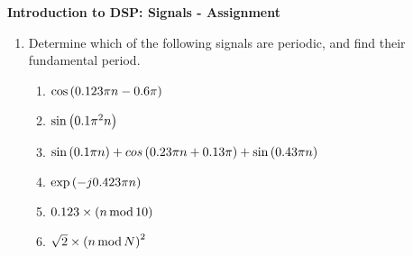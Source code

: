 \documentclass[9pt]{article}
\def\lp{\ensuremath\left(}
\def\rp{\ensuremath\right)}
\begin{document}
\begin{center}
    \begin{Large}
        \textbf{Introduction to DSP: Signals - Assignment}
    \end{Large}
\end{center}
\vspace{0.2cm}

\begin{multicols}{2}
    \begin{enumerate}
        \item Determine which of the following signals are periodic, and find their fundamental period.
        \begin{enumerate}
            \item $\cos\lp 0.123\pi n - 0.6\pi\rp$
            \item $\sin\lp 0.1\pi^2 n\rp$
            \item $\sin\lp 0.1\pi n\rp + cos\lp 0.23\pi n + 0.13\pi\rp + \sin\lp 0.43\pi n\rp$
            \item $\exp\lp -j 0.423 \pi n\rp$
            \item $0.123 \times \lp n\,\text{mod}\,10 \rp$
            \item $\sqrt{2} \times \lp n\,\text{mod}\,N \rp^2$
        \end{enumerate}
    \end{enumerate}
    \vfill
\end{multicols}
\end{document}
